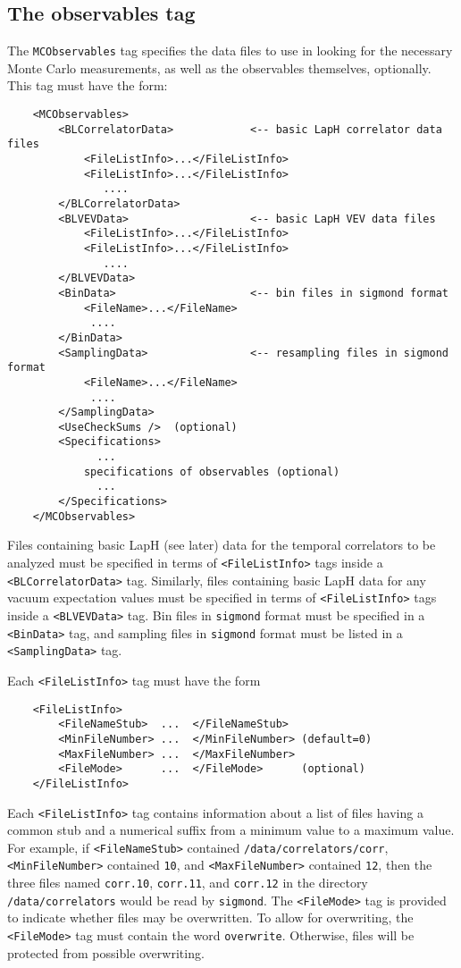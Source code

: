 \documentclass[12pt]{article}
\newcommand{\vb}{\texttt}
\begin{document}
\subsection{The observables tag}
The \vb{MCObservables} tag specifies the data files to use in looking
for the necessary Monte Carlo measurements, as well as the observables
themselves, optionally.  This tag must have the form:
\begin{verbatim}
    <MCObservables>
        <BLCorrelatorData>            <-- basic LapH correlator data files
            <FileListInfo>...</FileListInfo>
            <FileListInfo>...</FileListInfo> 
               .... 
        </BLCorrelatorData>
        <BLVEVData>                   <-- basic LapH VEV data files
            <FileListInfo>...</FileListInfo>
            <FileListInfo>...</FileListInfo> 
               ....
        </BLVEVData>
        <BinData>                     <-- bin files in sigmond format
            <FileName>...</FileName>
             .... 
        </BinData>
        <SamplingData>                <-- resampling files in sigmond format
            <FileName>...</FileName>
             .... 
        </SamplingData>
        <UseCheckSums />  (optional)
        <Specifications>
              ... 
            specifications of observables (optional)
              ...   
        </Specifications>
    </MCObservables>
\end{verbatim}

Files containing basic LapH (see later) data for the temporal correlators to be analyzed
must be specified in terms of \vb{<FileListInfo>} tags inside a
\vb{<BLCorrelatorData>} tag.  Similarly, files containing basic LapH data for
any vacuum expectation values must be specified in terms
of \vb{<FileListInfo>} tags inside a \vb{<BLVEVData>} tag.  Bin files
in \vb{sigmond} format must be specified in a \vb{<BinData>} tag, and sampling files
in \vb{sigmond} format must be listed in a \vb{<SamplingData>} tag.

Each \vb{<FileListInfo>} tag must have the form
\begin{verbatim}
    <FileListInfo>
        <FileNameStub>  ...  </FileNameStub>
        <MinFileNumber> ...  </MinFileNumber> (default=0)
        <MaxFileNumber> ...  </MaxFileNumber>
        <FileMode>      ...  </FileMode>      (optional)
    </FileListInfo>
\end{verbatim}
Each \vb{<FileListInfo>} tag contains information about a list of files
having a common stub and a numerical suffix from a minimum value to a 
maximum value. For example, if \vb{<FileNameStub>} contained
\vb{/data/correlators/corr}, \vb{<MinFileNumber>} contained
\vb{10}, and \vb{<MaxFileNumber>} contained \vb{12}, then
the three files named \vb{corr.10}, \vb{corr.11}, and \vb{corr.12}
in the directory \vb{/data/correlators} would be read by \vb{sigmond}.
The \vb{<FileMode>} tag is provided to indicate whether
files may be overwritten. To allow for overwriting, the
\vb{<FileMode>} tag must contain the word \vb{overwrite}. Otherwise,
files will be protected from possible overwriting.
\end{document}
